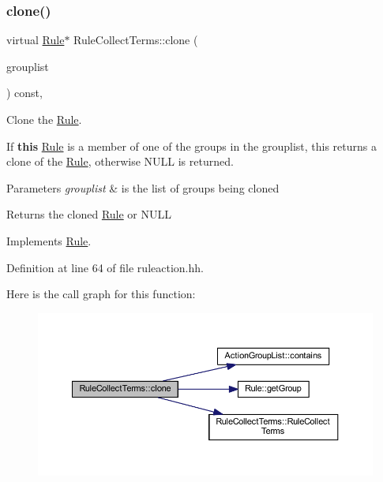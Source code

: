 \subsubsection{\texorpdfstring{clone()}{clone()}}
{\footnotesize\ttfamily virtual \mbox{\hyperlink{class_rule}{Rule}}$\ast$ Rule\+Collect\+Terms\+::clone (\begin{DoxyParamCaption}\item[{const \mbox{\hyperlink{class_action_group_list}{Action\+Group\+List}} \&}]{grouplist }\end{DoxyParamCaption}) const\hspace{0.3cm}{\ttfamily [inline]}, {\ttfamily [virtual]}}



Clone the \mbox{\hyperlink{class_rule}{Rule}}. 

If {\bfseries{this}} \mbox{\hyperlink{class_rule}{Rule}} is a member of one of the groups in the grouplist, this returns a clone of the \mbox{\hyperlink{class_rule}{Rule}}, otherwise N\+U\+LL is returned. 
\begin{DoxyParams}{Parameters}
{\em grouplist} & is the list of groups being cloned \\
\hline
\end{DoxyParams}
\begin{DoxyReturn}{Returns}
the cloned \mbox{\hyperlink{class_rule}{Rule}} or N\+U\+LL 
\end{DoxyReturn}


Implements \mbox{\hyperlink{class_rule_a70de90a76461bfa7ea0b575ce3c11e4d}{Rule}}.



Definition at line 64 of file ruleaction.\+hh.

Here is the call graph for this function\+:
\nopagebreak
\begin{figure}[H]
\begin{center}
\leavevmode
\includegraphics[width=350pt]{class_rule_collect_terms_a6be2ea00cf9d1c164d33b1f662c74c44_cgraph}
\end{center}
\end{figure}
\mbox{\label{class_rule_collect_terms_a86d2d1fdf9cbaa1d7403a786a300e477}} 
